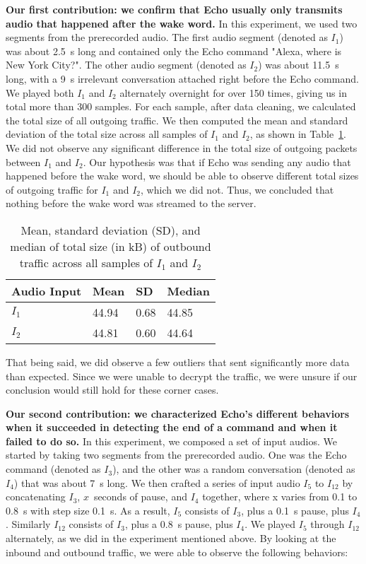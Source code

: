 \textbf{Our first contribution: we confirm that Echo usually only transmits audio that happened after the wake word.} In this experiment, we used two segments from the prerecorded audio. The first audio segment (denoted as $I_1$) was about 2.5~s long and contained only the Echo command "Alexa, where is New York City?". The other audio segment (denoted as $I_2$) was about 11.5~s long, with a 9~s irrelevant conversation attached right before the Echo command. We played both $I_1$ and $I_2$ alternately overnight for over 150 times, giving us in total more than 300 samples. For each sample, after data cleaning, we calculated the total size of all outgoing traffic. We then computed the mean and standard deviation of the total size across all samples of $I_1$ and $I_2$, as shown in Table~\ref{table1}. We did not observe any significant difference in the total size of outgoing packets between $I_1$ and $I_2$. Our hypothesis was that if Echo was sending any audio that happened before the wake word, we should be able to observe different total sizes of outgoing traffic for $I_1$ and $I_2$, which we did not. Thus, we concluded that nothing before the wake word was streamed to the server.

\begin{table}[!b]
\caption{Mean, standard deviation (SD), and median of total size (in kB) of outbound traffic across all samples of $I_1$ and $I_2$}
\begin{tabular}{llll}
\toprule
Audio Input & Mean & SD & Median \\
\midrule
$I_1$ & 44.94 & 0.68 & 44.85\\
$I_2$ & 44.81 & 0.60 & 44.64\\
\bottomrule
\end{tabular}
\label{table1}
\end{table}

That being said, we did observe a few outliers that sent significantly more data than expected. Since we were unable to decrypt the traffic, we were unsure if our conclusion would still hold for these corner cases.

\textbf{Our second contribution: we characterized Echo's different behaviors when it succeeded in detecting the end of a command and when it failed to do so.} In this experiment, we composed a set of input audios. We started by taking two segments from the prerecorded audio. One was the Echo command (denoted as $I_3$), and the other was a random conversation (denoted as $I_4$) that was about 7~s long. We then crafted a series of input audio $I_5$ to $I_{12}$ by concatenating $I_3$, $x$~seconds of pause, and $I_4$ together, where x varies from 0.1 to 0.8~s with step size 0.1~s. As a result, $I_5$ consists of $I_3$, plus a 0.1~s pause, plus $I_4$. Similarly $I_{12}$ consists of $I_3$, plus a 0.8~s pause, plus $I_4$. We played $I_5$ through $I_{12}$ alternately, as we did in the experiment mentioned above. By looking at the inbound and outbound traffic, we were able to observe the following behaviors:

